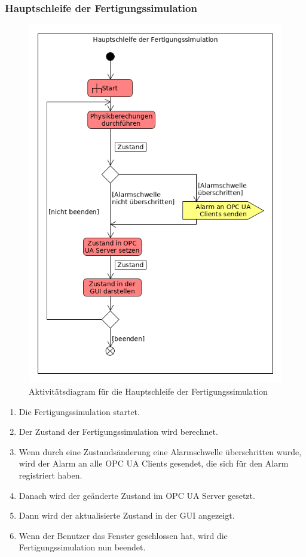 \documentclass[parskip=full]{scrartcl}
\begin{document}
\subsubsection{Hauptschleife der Fertigungssimulation}
\begin{figure}[H]
  \centering
  \includegraphics[scale=0.62]{media/Activities/main-simulation.png}
  \caption{Aktivitätsdiagram für die Hauptschleife der Fertigungssimulation}
\end{figure}

\begin{enumerate}[noitemsep]
 \item Die Fertigungssimulation startet.
 \item Der Zustand der \gls{Fertigungssimulation} wird berechnet.
 \item Wenn durch eine Zustandsänderung eine Alarmschwelle überschritten wurde, wird der Alarm an alle \glspl{OPC UA Client} gesendet,
 die sich für den Alarm registriert haben.
 \item Danach wird der geänderte Zustand im \gls{OPC UA Server} gesetzt.
 \item Dann wird der aktualisierte Zustand in der \gls{GUI} angezeigt.
 \item Wenn der Benutzer das Fenster geschlossen hat, wird die \gls{Fertigungssimulation} nun beendet.
\end{enumerate}
\end{document}
